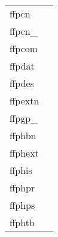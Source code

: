 \documentclass[11pt]{book}
\begin{document}
\begin{tabular}{lr}
ffpcn    & \pageref{ffpcn} \\
ffpcn\_ & \pageref{ffpcnx} \\
ffpcom      & \pageref{ffpcom} \\
ffpdat         & \pageref{ffpdat} \\
ffpdes  & \pageref{ffpdes} \\
ffpextn        & \pageref{ffgextn} \\
ffpgp\_ & \pageref{ffpgpx} \\
ffphbn      & \pageref{ffphbn} \\
ffphext       & \pageref{ffphpr} \\
ffphis      & \pageref{ffphis} \\
ffphpr       & \pageref{ffphpr} \\
ffphps       & \pageref{ffphps} \\
ffphtb      & \pageref{ffphtb} \\

\end{tabular}
\end{document}

